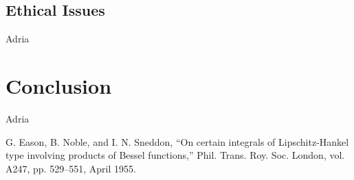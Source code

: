 \documentclass[conference]{IEEEtran}
\begin{document}
\subsection{Ethical Issues}
Adria



\section*{Conclusion}
Adria

\begin{thebibliography}{00}
 G. Eason, B. Noble, and I. N. Sneddon, ``On certain integrals of Lipschitz-Hankel type involving products of Bessel functions,'' Phil. Trans. Roy. Soc. London, vol. A247, pp. 529--551, April 1955.

\end{thebibliography}
\end{document}
